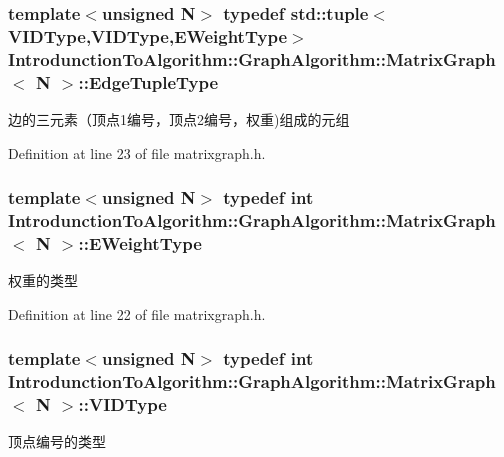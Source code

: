 \subsubsection[{Edge\+Tuple\+Type}]{\setlength{\rightskip}{0pt plus 5cm}template$<$unsigned N$>$ typedef std\+::tuple$<${\bf V\+I\+D\+Type},{\bf V\+I\+D\+Type},{\bf E\+Weight\+Type}$>$ {\bf Introdunction\+To\+Algorithm\+::\+Graph\+Algorithm\+::\+Matrix\+Graph}$<$ N $>$\+::{\bf Edge\+Tuple\+Type}}\label{struct_introdunction_to_algorithm_1_1_graph_algorithm_1_1_matrix_graph_a73af3fee951b91b4f5c48422460f8c03}
边的三元素（顶点1编号，顶点2编号，权重)组成的元组 

Definition at line 23 of file matrixgraph.\+h.

\hypertarget{struct_introdunction_to_algorithm_1_1_graph_algorithm_1_1_matrix_graph_af2d243f2c1bb8a101aa3f71f469c64e8}{}
\subsubsection[{E\+Weight\+Type}]{\setlength{\rightskip}{0pt plus 5cm}template$<$unsigned N$>$ typedef int {\bf Introdunction\+To\+Algorithm\+::\+Graph\+Algorithm\+::\+Matrix\+Graph}$<$ N $>$\+::{\bf E\+Weight\+Type}}\label{struct_introdunction_to_algorithm_1_1_graph_algorithm_1_1_matrix_graph_af2d243f2c1bb8a101aa3f71f469c64e8}
权重的类型 

Definition at line 22 of file matrixgraph.\+h.

\hypertarget{struct_introdunction_to_algorithm_1_1_graph_algorithm_1_1_matrix_graph_ae00582b52cc9f015cb9b1b8f4d521776}{}
\subsubsection[{V\+I\+D\+Type}]{\setlength{\rightskip}{0pt plus 5cm}template$<$unsigned N$>$ typedef int {\bf Introdunction\+To\+Algorithm\+::\+Graph\+Algorithm\+::\+Matrix\+Graph}$<$ N $>$\+::{\bf V\+I\+D\+Type}}\label{struct_introdunction_to_algorithm_1_1_graph_algorithm_1_1_matrix_graph_ae00582b52cc9f015cb9b1b8f4d521776}
顶点编号的类型 

